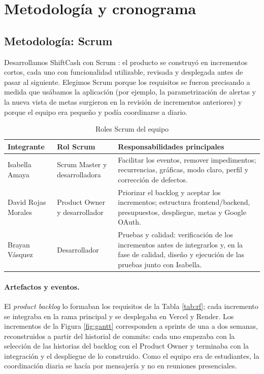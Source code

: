 \section{Metodología y cronograma}

\subsection{Metodología: Scrum}

Desarrollamos ShiftCash con Scrum \parencite{schwaber2020}: el producto se construyó en incrementos cortos, cada uno con funcionalidad utilizable, revisada y desplegada antes de pasar al siguiente. Elegimos Scrum porque los requisitos se fueron precisando a medida que usábamos la aplicación (por ejemplo, la parametrización de alertas y la nueva vista de metas surgieron en la revisión de incrementos anteriores) y porque el equipo era pequeño y podía coordinarse a diario.

\begin{table}[H]
\caption{Roles Scrum del equipo}
\label{tab:roles}
\begin{tabularx}{\linewidth}{L{3.6cm} L{3.4cm} Y}
\toprule
Integrante & Rol Scrum & Responsabilidades principales \\
\midrule
Isabella Amaya & Scrum Master y desarrolladora & Facilitar los eventos, remover impedimentos; recurrencias, gráficas, modo claro, perfil y corrección de defectos. \\
David Rojas Morales & Product Owner y desarrollador & Priorizar el backlog y aceptar los incrementos; estructura frontend/backend, presupuestos, despliegue, metas y Google OAuth. \\
Brayan Vásquez & Desarrollador & Pruebas y calidad: verificación de los incrementos antes de integrarlos y, en la fase de calidad, diseño y ejecución de las pruebas junto con Isabella. \\
\bottomrule
\end{tabularx}
\end{table}

\paragraph{Artefactos y eventos.} El \emph{product backlog} lo formaban los requisitos de la Tabla \ref{tab:rf}; cada incremento se integraba en la rama principal y se desplegaba en Vercel y Render. Los incrementos de la Figura \ref{fig:gantt} corresponden a sprints de una a dos semanas, reconstruidos a partir del historial de commits: cada uno empezaba con la selección de las historias del backlog con el Product Owner y terminaba con la integración y el despliegue de lo construido. Como el equipo era de estudiantes, la coordinación diaria se hacía por mensajería y no en reuniones presenciales.

